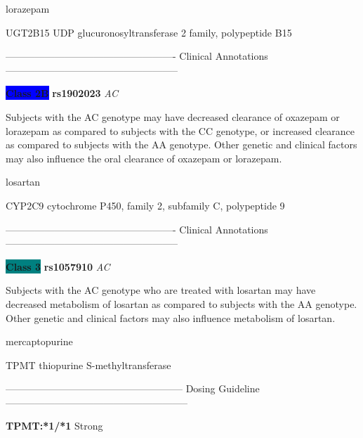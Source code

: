 \documentclass{resume} %
\begin{document}
\begin{rSection}{ lorazepam }
\begin{rSubsection}{ UGT2B15 }{ UDP glucuronosyltransferase 2 family, polypeptide B15 }{}{}
\item[]

\item[] ---------------------------------------------------- Clinical Annotations -----------------------------------------------------\newline
\item \textbf{\colorbox{blue} {Class 2B}} \textbf{ rs1902023 } \textit{ AC }
\item[] Subjects with the AC genotype may have decreased clearance of oxazepam or lorazepam as compared to subjects with the CC genotype, or increased clearance as compared to subjects with the AA genotype. Other genetic and clinical factors may also influence the oral clearance of oxazepam or lorazepam.
\end{rSubsection}

\end{rSection}\begin{rSection}{ losartan }
\item[]

\begin{rSubsection}{ CYP2C9 }{ cytochrome P450, family 2, subfamily C, polypeptide 9 }{}{}
\item[]

\item[] ---------------------------------------------------- Clinical Annotations -----------------------------------------------------\newline
\item \textbf{\colorbox{teal} {Class 3}} \textbf{ rs1057910 } \textit{ AC }
\item[] Subjects with the AC genotype who are treated with losartan may have decreased metabolism of losartan as compared to subjects with the AA genotype. Other genetic and clinical factors may also influence metabolism of losartan.
\end{rSubsection}

\end{rSection}\begin{rSection}{ mercaptopurine }
\item[]

\begin{rSubsection}{ TPMT }{ thiopurine S-methyltransferase }{}{}
\item[]
\item[] ------------------------------------------------------ Dosing Guideline --------------------------------------------------------\newline
\item[]
\item[] \textbf{ TPMT:*1/*1 } Strong


\end{rSubsection}
\end{rSection}
\end{document}
